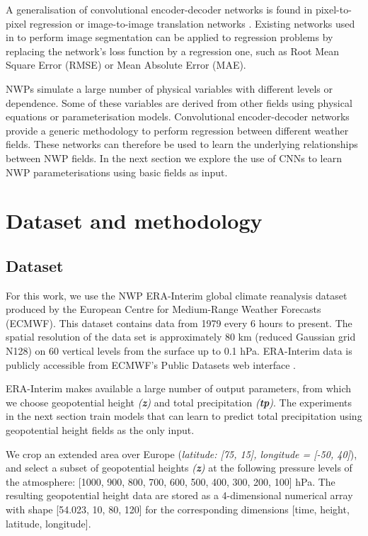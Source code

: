 \documentclass[twocol]{ametsoc}
\begin{document}
A generalisation of convolutional encoder-decoder networks is found in pixel-to-pixel regression or image-to-image translation networks \citep{isola2017image}. Existing networks used in to perform image segmentation can be applied to regression problems by replacing the network's loss function by a regression one, such as Root Mean Square Error (RMSE) or Mean Absolute Error (MAE).

NWPs simulate a large number of physical variables with different levels or dependence. Some of these variables are derived from other fields using physical equations or parameterisation models. Convolutional encoder-decoder networks provide a generic methodology to perform regression between different weather fields. These networks can therefore be used to learn the underlying relationships between NWP fields. In the next section we explore the use of CNNs to learn NWP parameterisations using basic fields as input.


\section{Dataset and methodology}

\subsection{Dataset}
For this work, we use the NWP ERA-Interim \citep{dee2011era} global climate reanalysis dataset produced by the European Centre for Medium-Range Weather Forecasts (ECMWF). This dataset contains data from 1979 every 6 hours to present. The spatial resolution of the data set is approximately 80 km (reduced Gaussian grid N128) on 60 vertical levels from the surface up to 0.1 hPa. ERA-Interim data is publicly accessible from ECMWF's Public Datasets web interface \citep{1321008426928}.

ERA-Interim makes available a large number of output parameters, from which we choose geopotential height \textit{(\textbf{z})} and total precipitation \textit{(\textbf{tp})}. The experiments in the next section train models that can learn to predict total precipitation using geopotential height fields as the only input.

We crop an extended area over Europe (\textit{latitude: [75, 15], longitude = [-50, 40]}), and select a subset of geopotential heights \textit{(\textbf{z})} at the following pressure levels of the atmosphere: [1000, 900, 800, 700, 600, 500, 400, 300, 200, 100] hPa. The resulting geopotential height data are stored as a 4-dimensional numerical array with shape [54.023, 10, 80, 120] for the corresponding dimensions [time, height, latitude, longitude]. 
\end{document}
